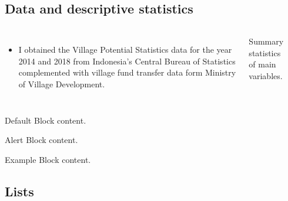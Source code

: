 \documentclass[
11pt,notheorems,hyperref={pdfauthor=Maghfira Ramadhani}
]{beamer}
\begin{document}
\subsection{Data and descriptive statistics}
\begin{frame}
\begin{columns}
        \begin{itemize}
            \item I obtained the Village Potential Statistics data for the year 2014 and 2018 from Indonesia's Central Bureau of Statistics complemented with village fund transfer data form Ministry of Village Development.
        \end{itemize}
    \begin{table}[h]
    \caption{Summary statistics of main variables. }
    \scalebox{0.6}{}
    \label{t1}\end{table}
\end{columns}
    
\end{frame}
\begin{frame}

   \centering
	\begin{minipage}[b]{0.5\textwidth}

	  \begin{block}{Default}
        Block content.
      \end{block}

      \begin{alertblock}{Alert}
        Block content.
      \end{alertblock}

      \begin{exampleblock}{Example}
        Block content.
      \end{exampleblock}      
      
	\end{minipage}	
\end{frame}


\subsection{Lists}
\end{document}

